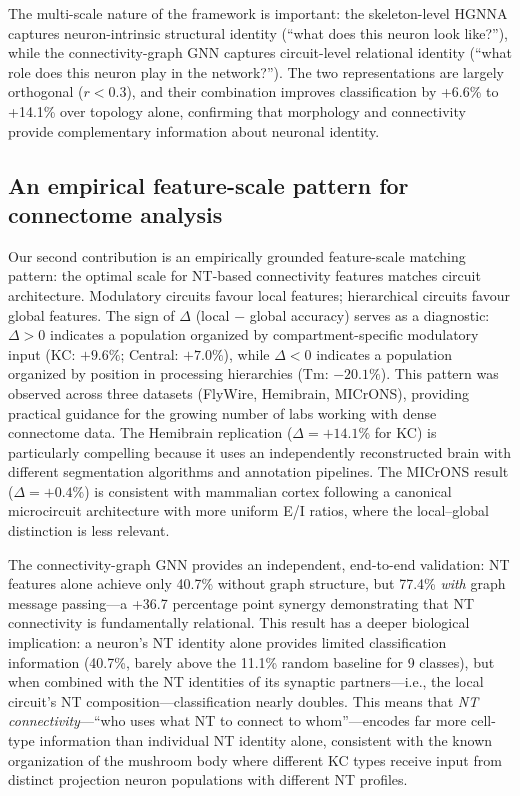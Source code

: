 \documentclass[10pt]{article}
\begin{document}
The multi-scale nature of the framework is important: the skeleton-level HGNNA captures neuron-intrinsic structural identity (``what does this neuron look like?''), while the connectivity-graph GNN captures circuit-level relational identity (``what role does this neuron play in the network?''). The two representations are largely orthogonal ($r < 0.3$), and their combination improves classification by +6.6\% to +14.1\% over topology alone, confirming that morphology and connectivity provide complementary information about neuronal identity.

\subsection*{An empirical feature-scale pattern for connectome analysis}

Our second contribution is an empirically grounded feature-scale matching pattern: the optimal scale for NT-based connectivity features matches circuit architecture. Modulatory circuits favour local features; hierarchical circuits favour global features. The sign of $\Delta$ (local $-$ global accuracy) serves as a diagnostic: $\Delta > 0$ indicates a population organized by compartment-specific modulatory input (KC: $+9.6\%$; Central: $+7.0\%$), while $\Delta < 0$ indicates a population organized by position in processing hierarchies (Tm: $-20.1\%$). This pattern was observed across three datasets (FlyWire, Hemibrain, MICrONS), providing practical guidance for the growing number of labs working with dense connectome data\cite{dorkenwald2024flywire,scheffer2020hemibrain,microns2021cortical}. The Hemibrain replication ($\Delta = +14.1\%$ for KC) is particularly compelling because it uses an independently reconstructed brain with different segmentation algorithms and annotation pipelines. The MICrONS result ($\Delta = +0.4\%$) is consistent with mammalian cortex following a canonical microcircuit architecture with more uniform E/I ratios, where the local--global distinction is less relevant.

The connectivity-graph GNN provides an independent, end-to-end validation: NT features alone achieve only 40.7\% without graph structure, but 77.4\% \textit{with} graph message passing---a +36.7 percentage point synergy demonstrating that NT connectivity is fundamentally relational. This result has a deeper biological implication: a neuron's NT identity alone provides limited classification information (40.7\%, barely above the 11.1\% random baseline for 9 classes), but when combined with the NT identities of its synaptic partners---i.e., the local circuit's NT composition---classification nearly doubles. This means that \textit{NT connectivity}---``who uses what NT to connect to whom''---encodes far more cell-type information than individual NT identity alone, consistent with the known organization of the mushroom body where different KC types receive input from distinct projection neuron populations with different NT profiles\cite{li2020kc_types,aso2014mushroom}.
\end{document}
